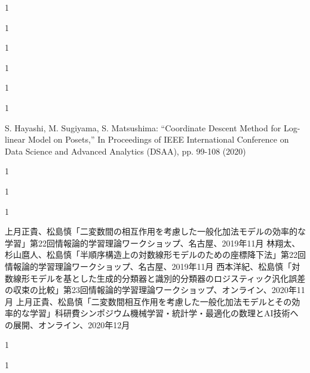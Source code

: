 \begin{招待講演}{1}

\end{招待講演}

\begin{招待論文}{1}

\end{招待論文}

\begin{受賞}{1}

\end{受賞}

\begin{著書}{1}

\end{著書}

\begin{雑誌論文}{1}

\end{雑誌論文}

\begin{査読付}{1}

S. Hayashi, M. Sugiyama, S. Matsushima: “Coordinate Descent Method for Log-linear Model on Posets,”  In Proceedings of IEEE International Conference on Data Science and Advanced Analytics (DSAA), pp. 99-108 (2020)
\end{査読付}

\begin{公開}{1}

\end{公開}

\begin{特許}{1}

\end{特許}

\begin{発表}{1}

 上月正貴、松島慎「二変数間の相互作用を考慮した一般化加法モデルの効率的な学習」第22回情報論的学習理論ワークショップ、名古屋、2019年11月
 林翔太、杉山麿人、松島慎「半順序構造上の対数線形モデルのための座標降下法」第22回情報論的学習理論ワークショップ、名古屋、2019年11月
 西本洋紀、松島慎「対数線形モデルを基とした生成的分類器と識別的分類器のロジスティック汎化誤差の収束の比較」第23回情報論的学習理論ワークショップ、オンライン、2020年11月
 上月正貴、松島慎「二変数間相互作用を考慮した一般化加法モデルとその効率的な学習」科研費シンポジウム機械学習・統計学・最適化の数理とAI技術への展開、オンライン、2020年12月
\end{発表}

\begin{特記}{1}

\end{特記}

\begin{報道}{1}

\end{報道}
